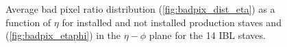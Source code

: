 %
\begin{figure}
        \centering
   \caption{Average bad pixel ratio distribution (\ref{fig:badpix_dist_eta}) as a function of $\eta$ for installed and not installed production staves and (\ref{fig:badpix_etaphi}) in the $\eta-\phi$ plane for the 14 IBL staves.}
    \label{fig:badratio_load_unload}
\end{figure}

